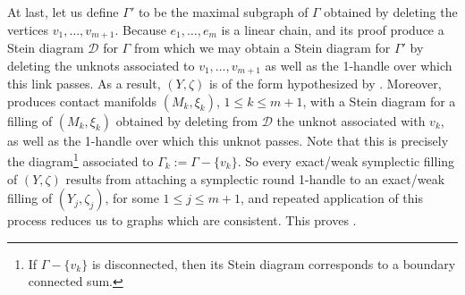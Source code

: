 \documentclass[11pt]{amsart}
\numberwithin{equation}{section}
\theoremstyle{plain}
\theoremstyle{definition}
\theoremstyle{remark}\newtheorem{rem}[equation]{Remark}%
\theoremstyle{remark}\newtheorem{obs}[equation]{Observation}%
\begin{document}
At last, let us define $\Gamma'$ to be the maximal subgraph of $\Gamma$ obtained by deleting the vertices $v_1,\ldots,v_{m+1}$.  Because $e_1,\ldots,e_m$ is a linear chain,  and its proof produce a Stein diagram $\mathcal{D}$ for $\Gamma$ from which we may obtain a Stein diagram for $\Gamma'$ by deleting the unknots associated to $v_1,\ldots,v_{m+1}$ as well as the 1-handle over which this link passes.  As a result, $(Y,\zeta)$ is of the form hypothesized by .  Moreover,  produces contact manifolds $(M_k,\xi_k)$, $1\leq k\leq m+1$, with a Stein diagram for a filling of $(M_k,\xi_k)$ obtained by deleting from $\mathcal{D}$ the unknot associated with $v_k$, as well as the 1-handle over which this unknot passes.  Note that this is precisely the diagram\footnote{If $\Gamma-\{v_k\}$ is disconnected, then its Stein diagram corresponds to a boundary connected sum.} associated to $\Gamma_k:=\Gamma-\{v_k\}$.  So every exact/weak symplectic filling of $(Y,\zeta)$ results from attaching a symplectic round 1-handle to an exact/weak filling of $(Y_j,\zeta_j)$, for some $1\leq j\leq m+1$, and repeated application of this process reduces us to graphs which are consistent.  This proves .





\vspace{10pt}
\end{document}
